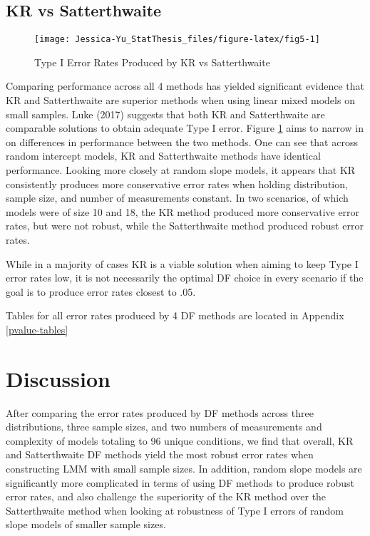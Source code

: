 \documentclass[12pt, twoside]{amherstthesis}
\begin{document}
\hypertarget{kr-vs-satterthwaite}{%
\subsection{KR vs Satterthwaite}\label{kr-vs-satterthwaite}}
\begin{figure}

{\centering \texttt{[image: Jessica-Yu\_StatThesis\_files/figure-latex/fig5-1]} 

}

\caption{Type I Error Rates Produced by KR vs Satterthwaite}\label{fig:fig5}
\end{figure}
Comparing performance across all 4 methods has yielded significant evidence that KR and Satterthwaite are superior methods when using linear mixed models on small samples. Luke (2017) suggests that both KR and Satterthwaite are comparable solutions to obtain adequate Type I error. Figure \ref{fig:fig5} aims to narrow in on differences in performance between the two methods. One can see that across random intercept models, KR and Satterthwaite methods have identical performance. Looking more closely at random slope models, it appears that KR consistently produces more conservative error rates when holding distribution, sample size, and number of measurements constant. In two scenarios, of which models were of size 10 and 18, the KR method produced more conservative error rates, but were not robust, while the Satterthwaite method produced robust error rates.

While in a majority of cases KR is a viable solution when aiming to keep Type I error rates low, it is not necessarily the optimal DF choice in every scenario if the goal is to produce error rates closest to .05.

Tables for all error rates produced by 4 DF methods are located in Appendix \ref{pvalue-tables}

\hypertarget{discussion}{%
\section{Discussion}\label{discussion}}

After comparing the error rates produced by DF methods across three distributions, three sample sizes, and two numbers of measurements and complexity of models totaling to 96 unique conditions, we find that overall, KR and Satterthwaite DF methods yield the most robust error rates when constructing LMM with small sample sizes. In addition, random slope models are significantly more complicated in terms of using DF methods to produce robust error rates, and also challenge the superiority of the KR method over the Satterthwaite method when looking at robustness of Type I errors of random slope models of smaller sample sizes.
\end{document}
